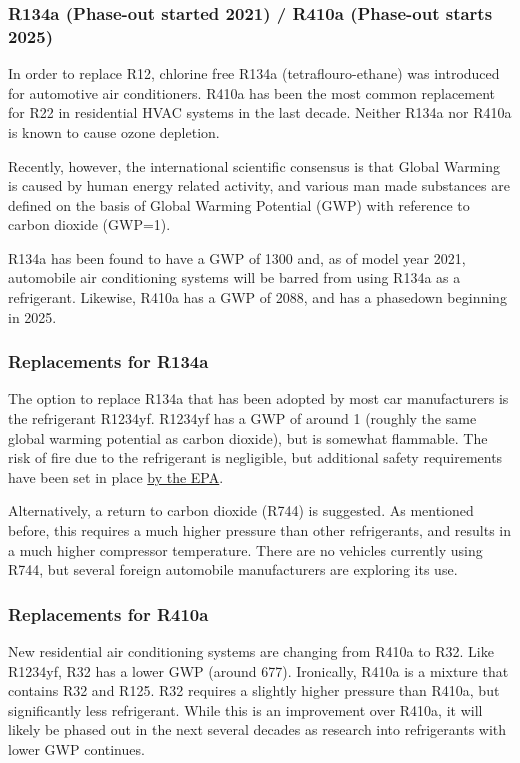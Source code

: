 \subsubsection{R134a (Phase-out started 2021) / R410a (Phase-out starts 2025)}
In order to replace R12, chlorine free R134a (tetraflouro-ethane) was introduced for automotive air conditioners.  R410a has been the most common replacement for R22 in residential HVAC systems in the last decade.  Neither R134a nor R410a is known to cause ozone depletion.

Recently, however, the international scientific consensus is that Global Warming is caused by human energy related activity, and various man made substances are defined on the basis of Global Warming Potential (GWP) with reference to carbon dioxide (GWP=1).

R134a has been found to have a GWP of 1300 and, as of model year 2021, automobile air conditioning systems will be barred from using R134a as a refrigerant.  Likewise, R410a has a GWP of 2088, and has a phasedown beginning in 2025.

\subsubsection{Replacements for R134a}
The option to replace R134a that has been adopted by most car manufacturers is the refrigerant R1234yf.  R1234yf has a GWP of around 1 (roughly the same global warming potential as carbon dioxide), but is somewhat flammable.  The risk of fire due to the refrigerant is negligible, but additional safety requirements have been set in place \href{https://www.epa.gov/mvac/refrigerant-transition-environmental-impacts}{by the EPA}.

Alternatively, a return to carbon dioxide (R744) is suggested.  As mentioned before, this requires a much higher pressure than other refrigerants, and results in a much higher compressor temperature.  There are no vehicles currently using R744, but several foreign automobile manufacturers are exploring its use.

\subsubsection{Replacements for R410a}
New residential air conditioning systems are changing from R410a to R32.  Like R1234yf, R32 has a lower GWP (around 677).  Ironically, R410a is a mixture that contains R32 and R125.  R32 requires a slightly higher pressure than R410a, but significantly less refrigerant.  While this is an improvement over R410a, it will likely be phased out in the next several decades as research into refrigerants with lower GWP continues.


